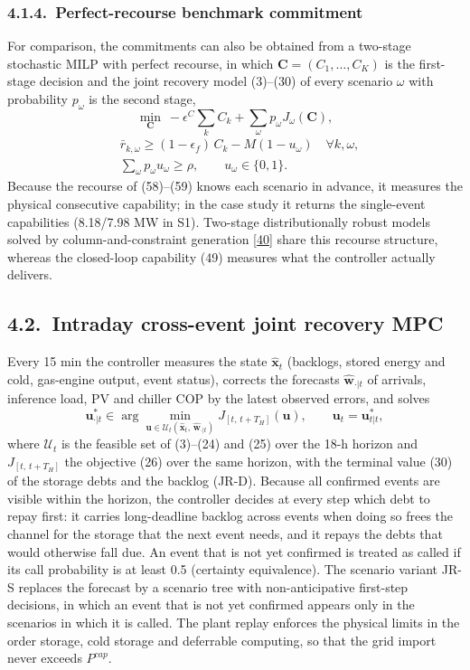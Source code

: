 \documentclass[a4paper,twocolumn,fleqn,10pt]{article}
\begin{document}
\subsubsection*{4.1.4.~Perfect-recourse benchmark commitment}

For comparison, the commitments can also be obtained from a two-stage stochastic MILP with perfect recourse, in which \(\mathbf C=(C_1,\dots,C_K)\) is the first-stage decision and the joint recovery model (3)--(30) of every scenario \(\omega\) with probability \(p_\omega\) is the second stage, \[\min_{\mathbf C}\ -\epsilon^{C}\textstyle\sum_kC_k+\sum_{\omega}p_\omega J_\omega(\mathbf C), \tag{58}\] \[\begin{aligned}&\bar r_{k,\omega}\ge(1-\epsilon_f)\,C_k-M(1-u_\omega)\quad\forall k,\omega,\\&\textstyle\sum_\omega p_\omega u_\omega\ge\rho,\qquad u_\omega\in\{0,1\}.\end{aligned} \tag{59}\] Because the recourse of (58)--(59) knows each scenario in advance, it measures the physical consecutive capability; in the case study it returns the single-event capabilities (8.18/7.98 MW in S1). Two-stage distributionally robust models solved by column-and-constraint generation [\hyperlink{ref40}{40}] share this recourse structure, whereas the closed-loop capability (49) measures what the controller actually delivers.

\subsection*{4.2.~Intraday cross-event joint recovery MPC}

Every 15 min the controller measures the state \(\hat{\mathbf x}_t\) (backlogs, stored energy and cold, gas-engine output, event status), corrects the forecasts \(\hat{\mathbf w}_{\cdot|t}\) of arrivals, inference load, PV and chiller COP by the latest observed errors, and solves \[\mathbf u^*_{\cdot|t}\in\arg\min_{\mathbf u\in\mathcal U_t(\hat{\mathbf x}_t,\,\hat{\mathbf w}_{\cdot|t})}J_{[t,\,t+T_H]}(\mathbf u),\qquad \mathbf u_t=\mathbf u^*_{t|t}, \tag{60}\] where \(\mathcal U_t\) is the feasible set of (3)--(24) and (25) over the 18-h horizon and \(J_{[t,\,t+T_H]}\) the objective (26) over the same horizon, with the terminal value (30) of the storage debts and the backlog (JR-D). Because all confirmed events are visible within the horizon, the controller decides at every step which debt to repay first: it carries long-deadline backlog across events when doing so frees the channel for the storage that the next event needs, and it repays the debts that would otherwise fall due. An event that is not yet confirmed is treated as called if its call probability is at least 0.5 (certainty equivalence). The scenario variant JR-S replaces the forecast by a scenario tree with non-anticipative first-step decisions, in which an event that is not yet confirmed appears only in the scenarios in which it is called. The plant replay enforces the physical limits in the order storage, cold storage and deferrable computing, so that the grid import never exceeds \(P^{cap}\).
\end{document}
